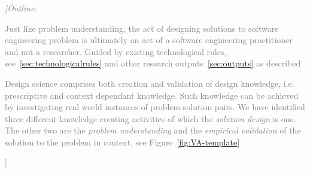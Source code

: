 \documentclass[graybox]{svmult}
\newcommand{\outline}[1]{\textcolor{gray}{{\it [Outline: #1]}}}
\newcommand{\outline}[1]{}
\begin{document}
\outline{




Just like problem understanding, the act of designing solutions to software engineering problem is ultimately an act of a software engineering practitioner and not a researcher. Guided by existing technological rules, see~\ref{sec:technologicalrules} and other research outputs~\ref{sec:outputs} as described





Design science comprises both creation and validation of design knowledge, i.e. prescriptive and context dependant knowledge. Such knowledge can be achieved by investigating real world instances of problem-solution pairs. We have identified three different knowledge creating activities of which the \emph{solution design} is one. The other two are the \emph{problem understanding} and the \emph{empirical validation} of the solution to the problem in context, see Figure~\ref{fig:VA-template}

}
\end{document}
